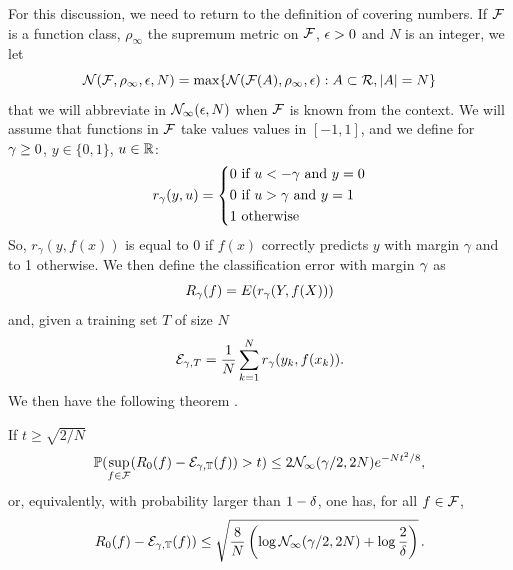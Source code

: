 For this discussion, we need to  return to the definition of covering numbers. If ${\mathcal F}$ is a function class, $\rho_\infty$ the supremum metric on ${\mathcal F}$, $\epsilon>0$ and $N$ is an integer, we let 
\[
{\mathcal N}({\mathcal F}, \rho_\infty, \epsilon, N) = \max\{{\mathcal N}({\mathcal F}(A), \rho_\infty, \epsilon): A\subset {\mathcal R}, |A| = N\}
\]
that we will abbreviate in ${\mathcal N}_\infty(\epsilon, N)$ when ${\mathcal F}$ is known from the context. We will assume that functions in ${\mathcal F}$ take values values in $[-1, 1]$, and we define for $\gamma \geq 0$, $y\in\{0,1\}$, $u\in {\mathbb{R}}$:
\[
r_\gamma(y, u) = \left\{
\begin{aligned}
0 & \text{ if } u< - \gamma \text{ and } y= 0  \\
0 & \text{ if } u> \gamma \text{ and } y= 1\\
1 & \text{ otherwise}
\end{aligned}
\right.
\]  
So, $r_\gamma(y, f(x))$ is equal to 0 if $f(x)$ correctly predicts $y$ with margin $\gamma$ and to 1 otherwise. 
We then define the classification error with margin $\gamma$ as
\[
R_\gamma(f) = E(r_\gamma(Y, f(X)))
\]
and, given a training set $T$ of size $N$
\[
{\mathcal E}_{\gamma, T} = \frac1N \sum_{k=1}^N r_\gamma(y_k, f(x_k)).
\]
We then have the following theorem \citep{anthony2009neural}.
\begin{theorem}
\label{th:margin}
If $t \geq \sqrt{2/N}$
\begin{equation}
\label{eq:margin}
\bm{\mathbb P}(\sup_{f\in{\mathcal F}} (R_0(f) -  {\mathcal E}_{\gamma, {\mathbb T}}(f)) > t) \leq 2 {\mathcal N}_\infty({\gamma}/2, 2N) e^{-{Nt^2}/8},
\end{equation}
or, equivalently, with probability larger than $1-\delta$, one has, for all $f\in {\mathcal F}$,
\begin{equation}
\label{eq:margin.2}
R_0(f) -  {\mathcal E}_{\gamma, {\mathbb T}}(f)) \leq \sqrt{\frac8N \left(\log {\mathcal N}_\infty({\gamma}/2, 2N) + \log\frac{2}{\delta}\right)}\,.
\end{equation}

\end{theorem}
